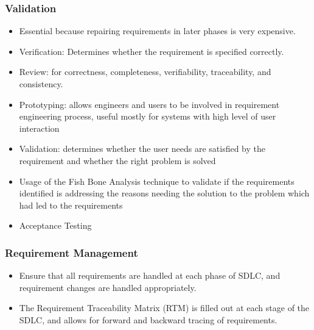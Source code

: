 \documentclass{article}
\begin{document}
\subsubsection{Validation}
\begin{itemize}
    \item Essential because repairing requirements in later phases is very expensive.

    
    \item Verification: Determines whether the requirement is specified correctly. 
    
    \item Review: for correctness, completeness, verifiability, traceability, and consistency.
    
    \item Prototyping: allows engineers and users to be involved in requirement engineering process, useful mostly for systems with high level of user interaction
    
    \item Validation: determines whether the user needs are satisfied by the requirement and whether the right problem is solved
    
    \item Usage of the Fish Bone Analysis technique to validate if the requirements identified is addressing the reasons needing the solution to the problem which had led to the requirements
    
    \item Acceptance Testing
\end{itemize}

\subsubsection{Requirement Management}
\begin{itemize}
    \item Ensure that all requirements are handled at each phase of SDLC, and requirement changes are handled appropriately.
    
    \item The Requirement Traceability Matrix (RTM) is filled out at each stage of the SDLC, and allows for forward and backward tracing of requirements.
\end{itemize}
\end{document}
